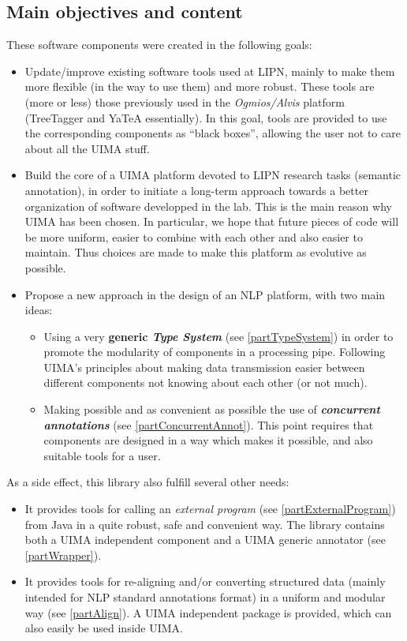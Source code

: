\documentclass{article}
\newenvironment{xitemize}{
\begin{itemize}
  \setlength{\itemsep}{.3\baselineskip}
  \setlength{\topsep}{0pt}
  \setlength{\parskip}{0pt}
  \setlength{\parsep}{0pt}
}{\end{itemize}}
\begin{document}
\subsection{Main objectives and content}

These software components were created in the following goals:
\begin{xitemize}
\item Update/improve existing software tools used at LIPN, mainly to make them more flexible (in the way to use them) and more robust. These tools are (more or less) those previously used in the {\em Ogmios/Alvis} platform (TreeTagger and YaTeA essentially). In this goal, tools are provided to use the corresponding components as ``black boxes'', allowing the user not to care about all the UIMA stuff.
\item Build the core of a UIMA platform devoted to LIPN research tasks (semantic annotation), in order to initiate a long-term approach towards a better organization of software developped in the lab. This is the main reason why UIMA has been chosen. In particular, we hope that future pieces of code will be more uniform, easier to combine with each other and also easier to maintain. Thus choices are made to make this platform as evolutive as possible.
\item Propose a new approach in the design of an NLP platform, with two main ideas:
\begin{xitemize}
\item Using a very {\bf generic {\em Type System}} (see \ref{partTypeSystem}) in order to promote the modularity of components in a processing pipe. Following UIMA's principles about making data transmission easier between different components not knowing about each other (or not much). 
\item Making possible and as convenient as possible the use of {\bf {\em concurrent annotations}} (see \ref{partConcurrentAnnot}). This point requires that components are designed in a way which makes it possible, and also suitable tools for a user.
\end{xitemize}
\end{xitemize}
\smallskip

As a side effect, this library also fulfill several other needs:
\begin{xitemize}
\item It provides tools for calling an {\em external program} (see \ref{partExternalProgram}) from Java in a quite robust, safe and convenient way. The library contains both  a UIMA independent component and a UIMA generic annotator (see \ref{partWrapper}).
\item It provides tools for re-aligning and/or converting structured data (mainly intended for NLP standard annotations format) in a uniform and modular way (see \ref{partAlign}). A UIMA independent package is provided, which can also easily be used inside UIMA.
\end{xitemize}
\end{document}

